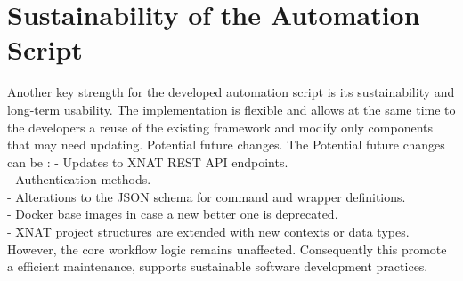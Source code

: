 \section{Sustainability of the Automation Script}

Another key strength for the developed automation script is its sustainability and long-term usability. The implementation is flexible and allows at the same time to the developers a reuse of the existing framework and modify only components that may need updating. Potential future changes. The Potential future changes can be :
- Updates to XNAT REST API endpoints.\\
- Authentication methods.\\
-  Alterations to the JSON schema for command and wrapper definitions.\\
-  Docker base images in case a new better one is deprecated.\\
- XNAT project structures are extended with new contexts or data types.\\
However, the core workflow logic remains unaffected. Consequently this promote a efficient maintenance, supports sustainable software development practices.
























